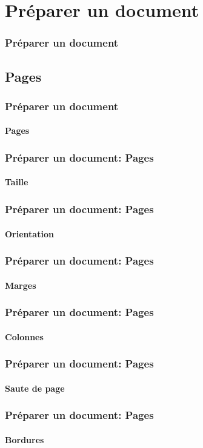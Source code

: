 \documentclass[xcolor=table]{beamer}
\begin{document}
\section{Préparer un document}

\begin{frame}
\frametitle{Préparer un document}

\end{frame}

\subsection{Pages}

\begin{frame}
\frametitle{Préparer un document}
\framesubtitle{Pages}

\end{frame}

\begin{frame}
\frametitle{Préparer un document: Pages}
\framesubtitle{Taille}

\end{frame}

\begin{frame}
\frametitle{Préparer un document: Pages}
\framesubtitle{Orientation}

\end{frame}

\begin{frame}
\frametitle{Préparer un document: Pages}
\framesubtitle{Marges}

\end{frame}

\begin{frame}
\frametitle{Préparer un document: Pages}
\framesubtitle{Colonnes}

\end{frame}

\begin{frame}
\frametitle{Préparer un document: Pages}
\framesubtitle{Saute de page}

\end{frame}

\begin{frame}
\frametitle{Préparer un document: Pages}
\framesubtitle{Bordures}

\end{frame}
\end{document}
